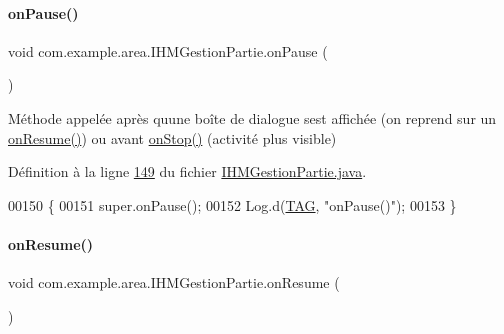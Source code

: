 \paragraph{\texorpdfstring{on\+Pause()}{onPause()}}
{\footnotesize\ttfamily void com.\+example.\+area.\+I\+H\+M\+Gestion\+Partie.\+on\+Pause (\begin{DoxyParamCaption}{ }\end{DoxyParamCaption})\hspace{0.3cm}{\ttfamily [protected]}}



Méthode appelée après qu\textquotesingle{}une boîte de dialogue s\textquotesingle{}est affichée (on reprend sur un \hyperlink{classcom_1_1example_1_1area_1_1_i_h_m_gestion_partie_a8ebd633d46edcc3218f4b5a5826c0163}{on\+Resume()}) ou avant \hyperlink{classcom_1_1example_1_1area_1_1_i_h_m_gestion_partie_a67aa6746480bdba2a5744a2ff8d6c48d}{on\+Stop()} (activité plus visible) 



Définition à la ligne \hyperlink{_i_h_m_gestion_partie_8java_source_l00149}{149} du fichier \hyperlink{_i_h_m_gestion_partie_8java_source}{I\+H\+M\+Gestion\+Partie.\+java}.


\begin{DoxyCode}
00150     \{
00151         super.onPause();
00152         Log.d(\hyperlink{classcom_1_1example_1_1area_1_1_i_h_m_gestion_partie_a78af1eb84e4a48b7f69c3ebee193933c}{TAG}, \textcolor{stringliteral}{"onPause()"});
00153     \}
\end{DoxyCode}
\mbox{\label{classcom_1_1example_1_1area_1_1_i_h_m_gestion_partie_a8ebd633d46edcc3218f4b5a5826c0163}} 
\paragraph{\texorpdfstring{on\+Resume()}{onResume()}}
{\footnotesize\ttfamily void com.\+example.\+area.\+I\+H\+M\+Gestion\+Partie.\+on\+Resume (\begin{DoxyParamCaption}{ }\end{DoxyParamCaption})\hspace{0.3cm}{\ttfamily [protected]}}



